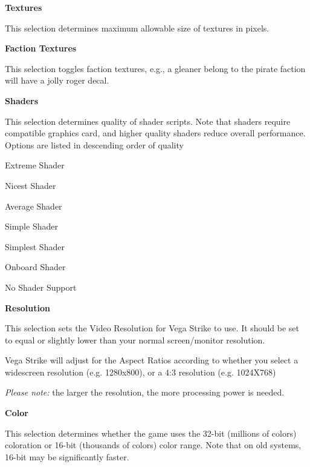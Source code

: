 \documentclass{article}
\begin{document}
 
 
\textbf{Textures}

This selection determines maximum allowable size of textures in pixels. 

\textbf{Faction Textures}

This selection toggles faction textures, e.g., a gleaner belong to the pirate faction will have a jolly roger decal.

\textbf{Shaders}

This selection determines quality of shader scripts. Note that shaders require compatible graphics card, and higher quality shaders reduce overall performance. Options are listed in descending order of quality
\begin{enumerate}
Extreme Shader
\end{enumerate}
\begin{enumerate}
Nicest Shader
\end{enumerate}
\begin{enumerate}
Average Shader
\end{enumerate}
\begin{enumerate}
Simple Shader
\end{enumerate}
\begin{enumerate}
Simplest Shader
\end{enumerate}
\begin{enumerate}
Onboard Shader
\end{enumerate}
\begin{enumerate}
No Shader Support
\end{enumerate}


\textbf{Resolution }

This selection sets the Video Resolution for Vega Strike to use. It should be set to equal or slightly lower than your normal screen/monitor resolution.

Vega Strike will adjust for the Aspect Ratios according to whether you select a widescreen resolution (e.g. 1280x800), or a 4:3 resolution (e.g. 1024X768)



 \textit{Please note:} the larger the resolution, the more processing power is needed. 



\textbf{Color }

This selection determines whether the game uses the 32-bit (millions of colors) coloration or 16-bit (thousands of colors) color range.  Note that on old systems, 16-bit may be significantly faster.
\end{document}
